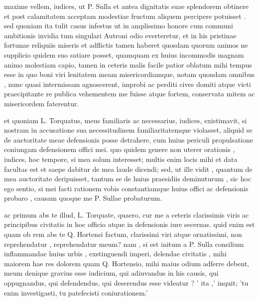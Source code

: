 
 maxime vellem, iudices, ut P. Sulla et antea dignitatis suae splendorem obtinere et post calamitatem acceptam modestiae fructum aliquem percipere potuisset . sed quoniam ita tulit casus infestus ut in amplissimo honore cum communi ambitionis invidia tum singulari Autroni odio everteretur, et in his pristinae fortunae reliquiis miseris et adflictis tamen haberet quosdam quorum animos ne supplicio quidem suo satiare posset, quamquam ex huius incommodis magnam animo molestiam capio, tamen in ceteris malis facile patior oblatum mihi tempus esse in quo boni viri lenitatem meam misericordiamque, notam quondam omnibus , nunc quasi intermissam agnoscerent, improbi ac perditi cives domiti atque victi praecipitante re publica vehementem me fuisse atque fortem, conservata mitem ac misericordem faterentur.

 et quoniam L. Torquatus, meus familiaris ac necessarius, iudices, existimavit, si nostram in accusatione sua necessitudinem familiaritatemque violasset, aliquid se de auctoritate meae defensionis posse detrahere, cum huius periculi propulsatione coniungam defensionem offici mei. quo quidem genere non uterer orationis , iudices, hoc tempore, si mea solum interesset; multis enim locis mihi et data facultas est et saepe dabitur de mea laude dicendi; sed, ut ille vidit , quantum de mea auctoritate deripuisset, tantum se de huius praesidiis deminuturum , sic hoc ego sentio, si mei facti rationem vobis constantiamque huius offici ac defensionis probaro , causam quoque me P. Sullae probaturum.

 ac primum abs te illud, L. Torquate, quaero, cur me a ceteris clarissimis viris ac principibus civitatis in hoc officio atque in defensionis iure secernas. quid enim est quam ob rem abs te Q. Hortensi factum, clarissimi viri atque ornatissimi, non reprehendatur , reprehendatur meum? nam , si est initum a P. Sulla consilium inflammandae huius urbis , exstinguendi imperi, delendae civitatis , mihi maiorem hae res dolorem quam Q. Hortensio, mihi maius odium adferre debent, meum denique gravius esse iudicium, qui adiuvandus in his causis, qui oppugnandus, qui defendendus, qui deserendus esse videatur ? ' ita ,' inquit; 'tu enim investigasti, tu patefecisti coniurationem.'

